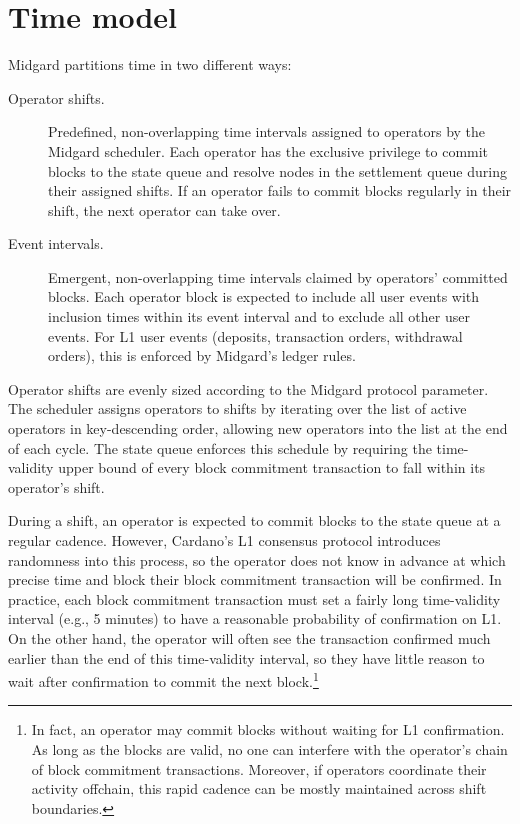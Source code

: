 \documentclass[../midgard.tex]{subfiles}
\begin{document}
\section{Time model}
\label{h:time-model}

Midgard partitions time in two different ways:
\begin{description}
    \item[Operator shifts.] Predefined, non-overlapping time intervals assigned to operators by the Midgard scheduler.
      Each operator has the exclusive privilege to commit blocks to the state queue and resolve nodes in the settlement queue during their assigned shifts.
      If an operator fails to commit blocks regularly in their shift, the next operator can take over.
    \item[Event intervals.] Emergent, non-overlapping time intervals claimed by operators' committed blocks.
      Each operator block is expected to include all user events with inclusion times within its event interval and to exclude all other user events.
      For L1 user events (deposits, transaction orders, withdrawal orders), this is enforced by Midgard's ledger rules.
\end{description}

Operator shifts are evenly sized according to the  Midgard protocol parameter.
The scheduler assigns operators to shifts by iterating over the list of active operators in key-descending order, allowing new operators into the list at the end of each cycle.
The state queue enforces this schedule by requiring the time-validity upper bound of every block commitment transaction to fall within its operator's shift.

During a shift, an operator is expected to commit blocks to the state queue at a regular cadence.
However, Cardano's L1 consensus protocol introduces randomness into this process, so the operator does not know in advance at which precise time and block their block commitment transaction will be confirmed.
In practice, each block commitment transaction must set a fairly long time-validity interval (e.g., 5 minutes) to have a reasonable probability of confirmation on L1.
On the other hand, the operator will often see the transaction confirmed much earlier than the end of this time-validity interval, so they have little reason to wait after confirmation to commit the next block.\footnote{In fact, an operator may commit blocks without waiting for L1 confirmation.
As long as the blocks are valid, no one can interfere with the operator's chain of block commitment transactions.
Moreover, if operators coordinate their activity offchain, this rapid cadence can be mostly maintained across shift boundaries.}
\end{document}
